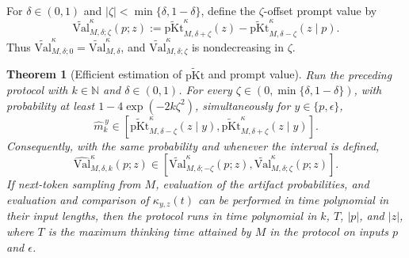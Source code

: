 \documentclass[letterpaper]{article} %
\newtheorem{theorem}{Theorem}[section]
\theoremstyle{definition}
\theoremstyle{remark}
\newcommand{\Val}{\mathrm{Val}}
\newcommand{\eps}{\epsilon}
\newcommand{\pKt}{\mathrm{pKt}}
\newcommand{\pKtt}{\widetilde{\pKt}}
\begin{document}
\noindent
For \(\delta\in(0,1)\) and
\(|\zeta|<\min\{\delta,1-\delta\}\), define the
\(\zeta\)-offset prompt value by
\[
\widetilde{\Val}^{\kappa}_{M,\delta;\zeta}(p;z)
:=
\pKtt^\kappa_{M,\delta+\zeta}(z)
-
\pKtt^\kappa_{M,\delta-\zeta}(z\mid p).
\]
Thus
\(\widetilde{\Val}^{\kappa}_{M,\delta;0}
=\widetilde{\Val}^{\kappa}_{M,\delta}\), and
\(\widetilde{\Val}^{\kappa}_{M,\delta;\zeta}\) is nondecreasing in \(\zeta\).

\begin{theorem}[Efficient estimation of \(\pKtt\) and prompt value]\label{thm:estimate}
Run the preceding protocol with \(k\in\mathbb N\) and
\(\delta\in(0,1)\). For every
\(\zeta\in(0,\min\{\delta,1-\delta\})\), with probability at least
\(1-4\exp(-2k\zeta^2)\), simultaneously for \(y\in\{p,\eps\}\),
\[
\widehat m_k^{\,y}
\in
\left[
\pKtt^\kappa_{M,\delta-\zeta}(z\mid y),
\pKtt^\kappa_{M,\delta+\zeta}(z\mid y)
\right].
\]
Consequently, with the same probability and whenever the interval is defined,
\[
\widehat{\Val}^{\kappa}_{M,\delta,k}(p;z)
\in
\left[
\widetilde{\Val}^{\kappa}_{M,\delta;-\zeta}(p;z),
\widetilde{\Val}^{\kappa}_{M,\delta;\zeta}(p;z)
\right].
\]
If next-token sampling from \(M\), evaluation of the artifact probabilities,
and evaluation and comparison of \(\kappa_{y,z}(t)\) can be performed in time
polynomial in their input lengths, then the protocol runs in time polynomial
in \(k\), \(T\), \(|p|\), and \(|z|\), where \(T\) is the maximum
thinking time attained by \(M\) in the protocol on inputs \(p\) and \(\eps\).
\end{theorem}
\end{document}
